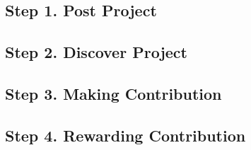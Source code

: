 \documentclass[12pt]{article}
\renewcommand{\_}{\kern-1.5pt\textunderscore\kern-1.5pt}
\begin{document}
\subsection*{Step 1. Post Project}
\subsection*{Step 2. Discover Project}
\subsection*{Step 3. Making Contribution}
\subsection*{Step 4. Rewarding Contribution}























\end{document}
